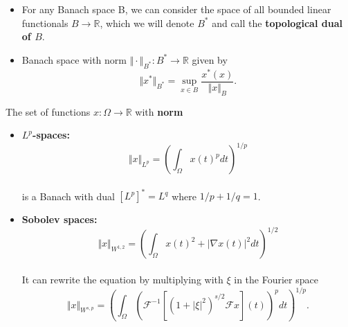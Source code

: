 \documentclass[landscape,headrule,footrule]{foils}
\begin{document}
\begin{frame}
\begin{flushleft}
\begin{itemize}
\item For any Banach space B, we can consider the space of all bounded linear functionals $B \rightarrow \mathbb{R}$, which we will denote $B^*$ and call the \textbf{topological dual of $B$}.
\\
\item Banach space with norm $\Vert \cdot \Vert_{B^*} :B^* \rightarrow \mathbb{R}$ given by 
\begin{equation}
\Vert x^* \Vert_{B^*} = \mathop{\sup}_{x \in B} \dfrac{x^*(x)}{\Vert x \Vert_B}.
\end{equation}
\end{itemize}
\end{flushleft}
\end{frame}

\begin{frame}
\begin{flushleft}
The set of functions $x:\Omega \rightarrow \mathbb{R}$ with \textbf{norm}
\begin{itemize}
\item \textbf{$L^p$-spaces:} 
\begin{equation}
\Vert x \Vert_{L^p} = \left( \int_{\Omega} x(t)^p dt \right)^{1/p}
\end{equation}
\\
is a Banach with dual $[L^p]^* = L^q$ where $1/p + 1/q = 1$.
\\
\item \textbf{Sobolev spaces:}
\begin{equation}
\Vert x \Vert_{W^{1,2}} = \left( \int_{\Omega} x(t)^2 + |\nabla x(t)|^2 dt \right)^{1/2}
\end{equation}
\\
It can rewrite the equation by multiplying with $\xi$ in the Fourier space
\begin{equation}
\Vert x \Vert_{W^{s,p}} = \left( \int_{\Omega} \left( \mathcal{F}^{-1} \left[(1+| \xi |^2)^{s/2} \mathcal{F}x \right] (t) \right)^p dt \right)^{1/p}.
\end{equation}
\end{itemize}
\end{flushleft}
\end{frame}
\end{document}
